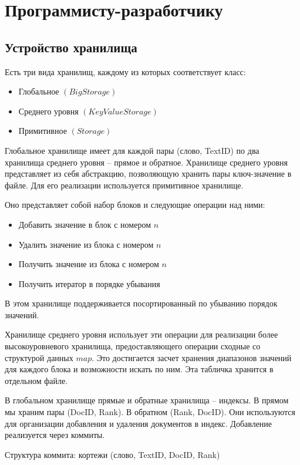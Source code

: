 \documentclass[12pt,a4paper]{article}
\begin{document}
\section{Программисту-разработчику}

\subsection{Устройство хранилища}
Есть три вида хранилищ, каждому из которых соответствует класс:
	\begin{itemize}
		\item Глобальное $(BigStorage)$
		\item Среднего уровня $(KeyValueStorage)$
		\item Примитивное $(Storage)$
	\end{itemize}

Глобальное хранилище имеет для каждой пары (слово, TextID) по два хранилища среднего уровня -- прямое и обратное.
Хранилище среднего уровня представляет из себя абстракцию, позволяющую хранить пары ключ-значение в файле.
Для его реализации используется примитивное хранилище.

Оно представляет собой набор блоков и следующие операции над ними:
\begin{itemize}
	\item Добавить значение в блок с номером $n$
	\item Удалить значение из блока с номером $n$
	\item Получить значение из блока с номером $n$
	\item Получить итератор в порядке убывания
\end{itemize}
В этом хранилище поддерживается посортированный по убыванию порядок значений.

Хранилище среднего уровня использует эти операции для реализации более высокоуровневого хранилища, предоставляющего
операции сходные со структурой данных $map$. Это достигается засчет хранения диапазонов значений для каждого блока
и возможности искать по ним. Эта табличка хранится в отдельном файле.

В глобальном хранилище прямые и обратные хранилища -- индексы. В прямом мы храним пары (DocID, Rank). В обратном (Rank, DocID).
Они используются для организации добавления и удаления документов в индекс. Добавление реализуется через коммиты.

Структура коммита: кортежи (слово, TextID, DocID, Rank)
\end{document}
